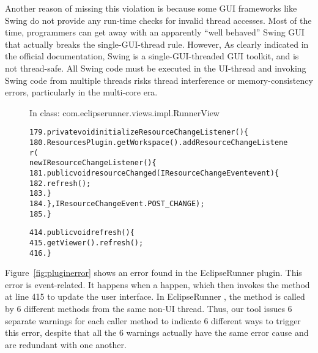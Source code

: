 Another reason of missing this violation is because some GUI frameworks like Swing
do not provide any run-time checks for invalid thread accesses. Most
of the time, programmers can get away with an apparently ``well behaved'' Swing
GUI that actually breaks the single-GUI-thread rule. However, As clearly
indicated in the official documentation, Swing is a single-GUI-threaded GUI
toolkit, and is not thread-safe. All Swing code must be executed in the UI-thread and
invoking Swing code from multiple threads risks thread interference
or memory-consistency errors, particularly in the multi-core era.



\begin{figure}[t]
\hspace{4mm}\small{In class: com.eclipserunner.views.impl.RunnerView}
\vspace{-2mm}
\begin{CodeOut}
\begin{alltt} 
179.private void initializeResourceChangeListener() \{
180.  ResourcesPlugin.getWorkspace().addResourceChangeListener(
        new IResourceChangeListener() \{
181.      public void resourceChanged(IResourceChangeEvent event) \{
182.        refresh();
183.      \}
184.  \}, IResourceChangeEvent.POST\_CHANGE);
185.\}

414.public void refresh() \{
415.  getViewer().refresh();
416.\}
\end{alltt}
\end{CodeOut}
\vspace*{-2.0ex}  %
\end{figure}

Figure~\ref{fig:pluginerror} shows an error found in the EclipseRunner
plugin. This error is event-related. It happens when a 
 happen, which then invokes the 
method at line 415 to update the user interface. In EclipseRunner
, the  method is
called by 6 different methods from the same non-UI thread. Thus, our
tool issues 6 separate warnings for each caller method to indicate
6 different ways to trigger this error, despite that all the 6 warnings
actually have the same error cause and are redundant with one another.


